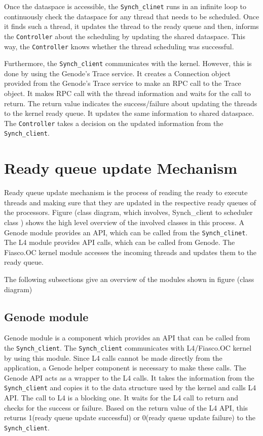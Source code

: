 Once the dataspace is accessible, the \texttt{Synch\_clinet} runs in an infinite loop to continuously check the dataspace for any thread that needs to be scheduled. Once it finds such a thread, it updates the thread to the ready queue and then, informs the \texttt{Controller} about the scheduling by updating the shared dataspace. This way, the \texttt{Controller} knows whether the thread scheduling was successful.

Furthermore, the \texttt{Synch\_client} communicates with the kernel. However, this is done by using the Genode's Trace service. It creates a Connection object provided from the Genode's Trace service to make an RPC call to the Trace object. It makes RPC call with the thread information and waits for the call to return. The return value indicates the success/failure about updating the threads to the kernel ready queue. It updates the same information to shared dataspace. The \texttt{Controller} takes a decision on the updated information from the \texttt{Synch\_client}.

\section{Ready queue update Mechanism} \label{design:rqupdate}
 
 Ready queue update mechanism is the process of reading the ready to execute threads and making sure that they are updated in the respective ready queues of the processors. Figure (class diagram, which involves, Synch\_client to scheduler class ) %
shows the high level overview of the involved classes in this process.
A Genode module provides an API, which can be called from the \texttt{Synch\_clinet}. The L4 module provides API calls, which can be called from Genode. The Fiasco.OC kernel module accesses the incoming threads and updates them to the ready queue.

The following subsections give an overview of the modules shown in figure (class diagram)%

\subsection{Genode module}
Genode module is a component which provides an API that can be called from the \texttt{Synch\_client}. The  \texttt{Synch\_client} communicates with L4/Fiasco.OC kernel by using this module. Since L4 calls cannot be made directly from the application, a Genode helper component is necessary to make these calls. The Genode API acts as a wrapper to the L4 calls. It takes the information from the \texttt{Synch\_client} and copies it to the data structure used by the kernel and calls L4 API. The call to L4 is a blocking one. It waits for the L4 call to return and checks for the success or failure. Based on the return value of the L4 API, this returns 1(ready queue update successful) or 0(ready queue update failure) to the \texttt{Synch\_client}.

